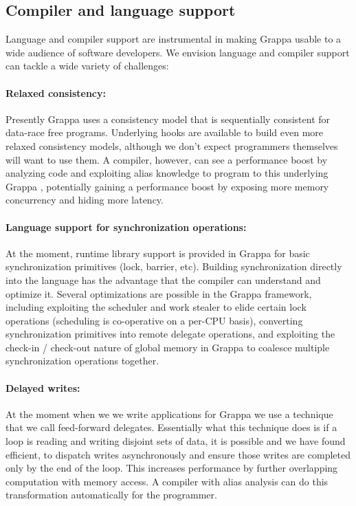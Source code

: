 \subsection{Compiler and language support}

Language and compiler support are instrumental in making Grappa usable to a wide audience of software developers. We envision language and compiler support can tackle a wide variety of challenges:

\paragraph{Relaxed consistency:} Presently Grappa uses a consistency model that is sequentially consistent for data-race free programs.  Underlying hooks are available to build even more relaxed consistency models, although we don't expect programmers themselves will want to use them.  A compiler, however, can see a performance boost by analyzing code and exploiting alias knowledge to program to this underlying Grappa \api, potentially gaining a performance boost by exposing more memory concurrency and hiding more latency.

\paragraph{Language support for synchronization operations: } At the moment, runtime library support is provided in Grappa for basic synchronization primitives (lock, barrier, etc).  Building synchronization directly into the language has the advantage that the compiler can understand and optimize it.  Several optimizations are possible in the Grappa framework, including exploiting the scheduler and work stealer to elide certain lock operations (scheduling is co-operative on a per-CPU basis), converting synchronization primitives into remote delegate operations, and exploiting the check-in / check-out nature of global memory in Grappa to coalesce multiple synchronization operations together.

\paragraph{Delayed writes: } At the moment when we we write applications for Grappa we use a technique that we call feed-forward delegates.  Essentially what this technique does is if a loop is reading and writing disjoint sets of data, it is possible and we have found efficient, to dispatch writes asynchronously and ensure those writes are completed only by the end of the loop.  This increases performance by further overlapping computation with memory access.  A compiler with alias analysis can do this transformation automatically for the programmer.

